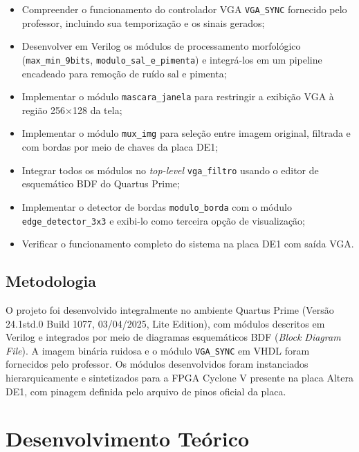 \documentclass[12pt, a4paper]{article}
\begin{document}
	\begin{itemize}
		\item Compreender o funcionamento do controlador VGA \texttt{VGA\_SYNC}
		fornecido pelo professor, incluindo sua temporização e os sinais gerados;
		\item Desenvolver em Verilog os módulos de processamento morfológico
		(\texttt{max\_min\_9bits}, \texttt{modulo\_sal\_e\_pimenta}) e integrá-los
		em um pipeline encadeado para remoção de ruído sal e pimenta;
		\item Implementar o módulo \texttt{mascara\_janela} para restringir a exibição
		VGA à região 256$\times$128 da tela;
		\item Implementar o módulo \texttt{mux\_img} para seleção entre imagem original,
		filtrada e com bordas por meio de chaves da placa DE1;
		\item Integrar todos os módulos no \textit{top-level} \texttt{vga\_filtro}
		usando o editor de esquemático BDF do Quartus Prime;
		\item Implementar o detector de bordas \texttt{modulo\_borda} com o módulo
		\texttt{edge\_detector\_3x3} e exibi-lo como terceira opção de visualização;
		\item Verificar o funcionamento completo do sistema na placa DE1 com saída VGA.
	\end{itemize}
	
	\subsection{Metodologia}
	
	O projeto foi desenvolvido integralmente no ambiente Quartus Prime
	(Versão 24.1std.0 Build 1077, 03/04/2025, Lite Edition), com módulos
	descritos em Verilog e integrados por meio de diagramas esquemáticos BDF
	(\textit{Block Diagram File}). A imagem binária ruidosa e o módulo
	\texttt{VGA\_SYNC} em VHDL foram fornecidos pelo professor. Os módulos
	desenvolvidos foram instanciados hierarquicamente e sintetizados para a FPGA
	Cyclone V presente na placa Altera DE1, com pinagem definida
	pelo arquivo de pinos oficial da placa.
	
	\section{Desenvolvimento Teórico}
	
\end{document}
